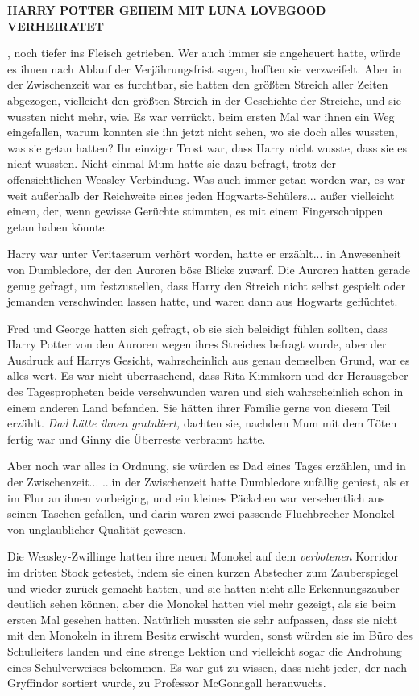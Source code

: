\textbf{HARRY POTTER GEHEIM MIT LUNA LOVEGOOD VERHEIRATET}

, noch tiefer ins Fleisch getrieben. Wer auch immer sie angeheuert hatte, würde
es ihnen nach Ablauf der Verjährungsfrist sagen, hofften sie verzweifelt. Aber
in der Zwischenzeit war es furchtbar, sie hatten den größten Streich aller
Zeiten abgezogen, vielleicht den größten Streich in der Geschichte der Streiche,
und sie wussten nicht mehr, wie. Es war verrückt, beim ersten Mal war ihnen ein
Weg eingefallen, warum konnten sie ihn jetzt nicht sehen, wo sie doch alles
wussten, was sie getan hatten? Ihr einziger Trost war, dass Harry nicht wusste,
dass sie es nicht wussten. Nicht einmal Mum hatte sie dazu befragt, trotz der
offensichtlichen Weasley-Verbindung. Was auch immer getan worden war, es war
weit außerhalb der Reichweite eines jeden Hogwarts-Schülers... außer vielleicht
einem, der, wenn gewisse Gerüchte stimmten, es mit einem Fingerschnippen getan
haben könnte.

Harry war unter Veritaserum verhört worden, hatte er erzählt... in Anwesenheit
von Dumbledore, der den Auroren böse Blicke zuwarf. Die Auroren hatten gerade
genug gefragt, um festzustellen, dass Harry den Streich nicht selbst gespielt
oder jemanden verschwinden lassen hatte, und waren dann aus Hogwarts geflüchtet.

Fred und George hatten sich gefragt, ob sie sich beleidigt fühlen sollten, dass
Harry Potter von den Auroren wegen ihres Streiches befragt wurde, aber der
Ausdruck auf Harrys Gesicht, wahrscheinlich aus genau demselben Grund, war es
alles wert. Es war nicht überraschend, dass Rita Kimmkorn und der Herausgeber
des Tagespropheten beide verschwunden waren und sich wahrscheinlich schon in
einem anderen Land befanden. Sie hätten ihrer Familie gerne von diesem Teil
erzählt. \emph{Dad hätte ihnen gratuliert,} dachten sie, nachdem Mum mit dem
Töten fertig war und Ginny die Überreste verbrannt hatte.

Aber noch war alles in Ordnung, sie würden es Dad eines Tages erzählen, und in
der Zwischenzeit... ...in der Zwischenzeit hatte Dumbledore zufällig geniest,
als er im Flur an ihnen vorbeiging, und ein kleines Päckchen war versehentlich
aus seinen Taschen gefallen, und darin waren zwei passende Fluchbrecher-Monokel
von unglaublicher Qualität gewesen.

Die Weasley-Zwillinge hatten ihre neuen Monokel auf dem \glqq{}
\emph{verbotenen}\grqq{} Korridor im dritten Stock getestet, indem sie einen
kurzen Abstecher zum Zauberspiegel und wieder zurück gemacht hatten, und sie
hatten nicht alle Erkennungszauber deutlich sehen können, aber die Monokel
hatten viel mehr gezeigt, als sie beim ersten Mal gesehen hatten. Natürlich
mussten sie sehr aufpassen, dass sie nicht mit den Monokeln in ihrem Besitz
erwischt wurden, sonst würden sie im Büro des Schulleiters landen und eine
strenge Lektion und vielleicht sogar die Androhung eines Schulverweises
bekommen. Es war gut zu wissen, dass nicht jeder, der nach Gryffindor sortiert
wurde, zu Professor McGonagall heranwuchs.

